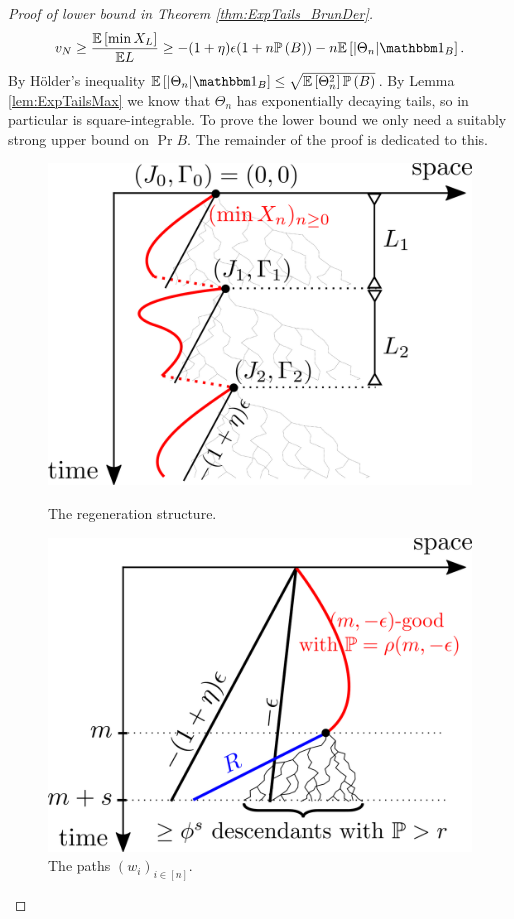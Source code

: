 \begin{proof}[Proof of lower bound in Theorem \ref{thm:ExpTails_BrunDer}]
\begin{equation}\label{eqn:lowerBdd}
v_N \geq \frac{\Ex{\min X_L}}{\E L} \geq -(1+\eta)\epsilon (1 + n\Pr{B}) - n\Ex{|\Theta_n| \Ind_B}. 
\end{equation}
By Hölder's inequality $\Ex{|\Theta_n| \Ind_B} \leq \sqrt{\Ex{\Theta_n^2}\Pr{B}}$. By Lemma \ref{lem:ExpTailsMax} we know that $\Theta_n$ has exponentially decaying tails, so in particular is square-integrable. To prove the lower bound we only need a suitably strong upper bound on $\Pr{B}$. The remainder of the proof is dedicated to this. \\

\begin{figure}
\centering
\begin{minipage}{0.45\textwidth}
  \centering
  \includegraphics[width=\linewidth]{graphics/g4}
  \caption{The regeneration structure. }
  \label{fig:regen_structure}
\end{minipage}
\begin{minipage}{0.45\textwidth}
  \centering
  \includegraphics[width=\linewidth]{graphics/g3}
  \caption{The paths $(w_i)_{i \in [n]}$. }
  \label{fig:weird_constant_choice}
\end{minipage}\hfill%
\end{figure}



\end{proof}
